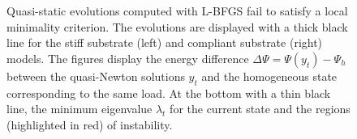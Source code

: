 \begin{figure}[htbp]
    \centering
    \caption{Quasi-static evolutions computed with L-BFGS fail to satisfy a local minimality criterion. The evolutions are displayed with a thick black line for the stiff substrate (left) and compliant substrate (right) models. The figures display the energy difference $\Delta \Psi = \Psi(y_t)-\Psi_h$ between the quasi-Newton solutions $y_t$ and the homogeneous state corresponding to the same load. At the bottom with a thin black line, the minimum eigenvalue $\lambda_t$ for the current state and the regions (highlighted in red) of instability.}
    \label{fig:}
\end{figure}


